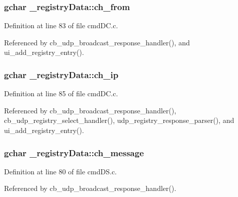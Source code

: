 \subsubsection[{\texorpdfstring{ch\+\_\+from}{ch_from}}]{\setlength{\rightskip}{0pt plus 5cm}gchar \+\_\+registry\+Data\+::ch\+\_\+from}\hypertarget{struct__registry_data_a5fac46820690525a9d8b3f0185bca587}{}\label{struct__registry_data_a5fac46820690525a9d8b3f0185bca587}


Definition at line 83 of file cmd\+D\+C.\+c.



Referenced by cb\+\_\+udp\+\_\+broadcast\+\_\+response\+\_\+handler(), and ui\+\_\+add\+\_\+registry\+\_\+entry().

\subsubsection[{\texorpdfstring{ch\+\_\+ip}{ch_ip}}]{\setlength{\rightskip}{0pt plus 5cm}gchar \+\_\+registry\+Data\+::ch\+\_\+ip}\hypertarget{struct__registry_data_a814e064e77a6aac5866c88cb51acd971}{}\label{struct__registry_data_a814e064e77a6aac5866c88cb51acd971}


Definition at line 85 of file cmd\+D\+C.\+c.



Referenced by cb\+\_\+udp\+\_\+broadcast\+\_\+response\+\_\+handler(), cb\+\_\+udp\+\_\+registry\+\_\+select\+\_\+handler(), udp\+\_\+registry\+\_\+response\+\_\+parser(), and ui\+\_\+add\+\_\+registry\+\_\+entry().

\subsubsection[{\texorpdfstring{ch\+\_\+message}{ch_message}}]{\setlength{\rightskip}{0pt plus 5cm}gchar \+\_\+registry\+Data\+::ch\+\_\+message}\hypertarget{struct__registry_data_ae9b0c1e6f13d980dcc7515def6b20b5e}{}\label{struct__registry_data_ae9b0c1e6f13d980dcc7515def6b20b5e}


Definition at line 80 of file cmd\+D\+S.\+c.



Referenced by cb\+\_\+udp\+\_\+broadcast\+\_\+response\+\_\+handler().

